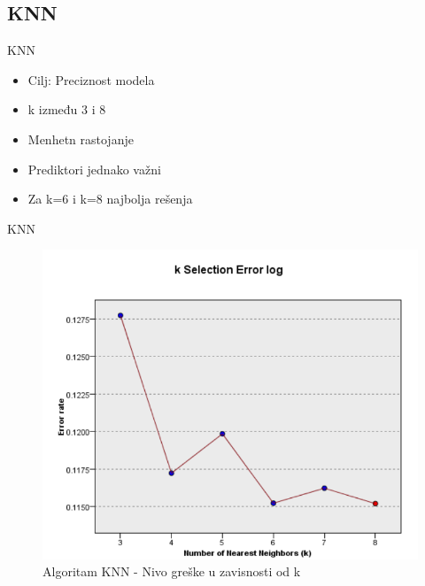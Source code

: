 \documentclass{beamer}
\begin{document}
\subsection{KNN}

\begin{frame}{KNN}
    \begin{itemize}
        \item Cilj: Preciznost modela
        \item k između 3 i 8
        \item Menhetn rastojanje
        \item Prediktori jednako važni
        \item Za k=6 i k=8 najbolja rešenja
    \end{itemize}
\end{frame}

\begin{frame}{KNN}
    \begin{figure}[h!]
                \begin{center}
                \includegraphics[scale=0.50]{knn_error.png}
                \end{center}
                \caption{Algoritam KNN - Nivo greške u zavisnosti od k}
             \end{figure}
\end{frame}
\end{document}
